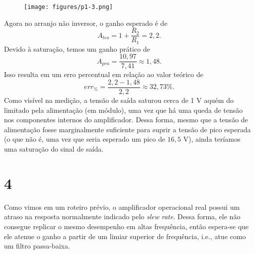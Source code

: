 \documentclass[a4paper]{report}
\begin{document}
\begin{figure}[H]
    \centering
    \texttt{[image: figures/p1-3.png]}
\end{figure}

Agora no arranjo não inversor, o ganho esperado é de \[
A_{teo} = 1 + \frac{R_2}{R_1} = 2,2
.\] Devido à saturação, temos um ganho prático de \[
A_{pra} = \frac{10,97}{7,41} \approx 1,48
.\] Isso resulta em um erro percentual em relação ao valor teórico de \[
err_{\%} = \frac{2,2 - 1,48}{2,2} \approx 32,73 \%
.\] Como visível na medição, a tensão de saída saturou cerca de 1 V aquém do limitado pela alimentação (em módulo), uma vez que há uma queda de tensão nos componentes internos do amplificador. Dessa forma, mesmo que a tensão de alimentação fosse marginalmente suficiente para suprir a tensão de pico esperada (o que não é, uma vez que seria esperado um pico de $16,5$ V), ainda teríamos uma saturação do sinal de saída.

\section*{4}

Como vimos em um roteiro prévio, o amplificador operacional real possui um atraso na resposta normalmente indicado pelo \emph{slew rate}. Dessa forma, ele não consegue replicar o mesmo desempenho em altas frequência, então espera-se que ele atenue o ganho a partir de um limiar superior de frequência, i.e., atue como um filtro passa-baixa.
\end{document}
